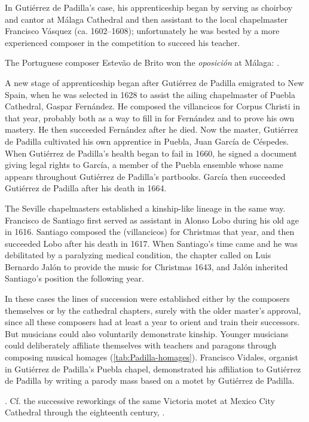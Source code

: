 In Gutiérrez de Padilla's case, his apprenticeship began by serving as choirboy
and cantor at Málaga Cathedral and then assistant to the local chapelmaster
Francisco Vásquez (ca. 1602--1608); unfortunately he was bested by a more
experienced composer in the competition to succeed his teacher.%
\begin{Footnote}
    The Portuguese composer Estevão de Brito won the \emph{oposición} at
    Málaga: \autocites{Gembero:Padilla}{Stevenson:BritoE}.
\end{Footnote}
A new stage of apprenticeship began after Gutiérrez de Padilla emigrated to New
Spain, when he was selected in 1628 to assist the ailing chapelmaster of Puebla
Cathedral, Gaspar Fernández.%
    \Autocite{Morales:Fernandez}
He composed the villancicos for Corpus Christi in that year, probably both as a
way to fill in for Fernández and to prove his own mastery.%
    \Autocite{Cashner:Cards}
He then succeeded Fernández after he died.
Now the master, Gutiérrez de Padilla cultivated his own apprentice in Puebla,
Juan García de Céspedes.
When Gutiérrez de Padilla's health began to fail in 1660, he signed a
 document giving legal rights to García, a member of
the Puebla ensemble whose name appears throughout Gutiérrez de Padilla's
partbooks.  
García then succeeded Gutiérrez de Padilla after his death in 1664.%
    \Autocite[237--238]{Mauleon:PadillaCivil}

The Seville chapelmasters established a kinship-like lineage in the same way.
Francisco de Santiago first served as assistant in Alonso Lobo during his old
age in 1616.%
    \Autocites
    {Stevenson:SantiagoF}
    {Perez:DMEH-Santiago}
Santiago composed the  (villancicos) for Christmas that year,
and then succeeded Lobo after his death in 1617.
When Santiago's time came and he was debilitated by a paralyzing medical
condition, the chapter called on Luis Bernardo Jalón to provide the music for
Christmas 1643, and Jalón inherited Santiago's position the following year.

In these cases the lines of succession were established either by the composers
themselves or by the cathedral chapters, surely with the older master's
approval, since all these composers had at least a year to orient and train
their successors.
But musicians could also voluntarily demonstrate kinship.
Younger musicians could deliberately affiliate themselves with teachers and
paragons through composing musical homages (\cref{tab:Padilla-homages}).
Francisco Vidales, organist in Gutiérrez de Padilla's Puebla chapel,
demonstrated his affiliation to Gutiérrez de Padilla by writing a parody mass
based on a motet by Gutiérrez de Padilla.%
\begin{Footnote}
    \Autocite{Koegel:Padilla}.    
    Cf. the successive reworkings of the same Victoria motet at
    Mexico City Cathedral through the eighteenth century, 
    \autocite{Goldman:StileAntico}.
\end{Footnote}

